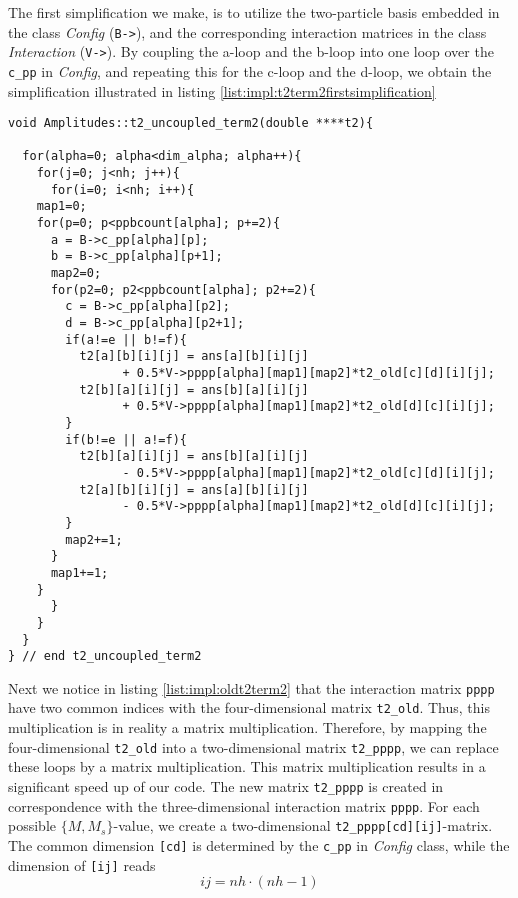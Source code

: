 The first simplification we make, is to utilize the two-particle basis embedded in the class \emph{Config} (\texttt{B->}), and the corresponding interaction matrices in the class \emph{Interaction} (\texttt{V->}). By coupling the a-loop and the b-loop into one loop over the \texttt{c\_pp} in \emph{Config}, and repeating this for the c-loop and the d-loop, we obtain the simplification illustrated in listing \ref{list:impl:t2term2firstsimplification}
\begin{lstlisting}[label={list:impl:t2term2firstsimplification},caption={illustrates the first simplification of M.P.Lohne's implementation of amp1 class function t2\_uncoupled\_term2}]
void Amplitudes::t2_uncoupled_term2(double ****t2){

  for(alpha=0; alpha<dim_alpha; alpha++){
    for(j=0; j<nh; j++){
      for(i=0; i<nh; i++){
	map1=0;
	for(p=0; p<ppbcount[alpha]; p+=2){
	  a = B->c_pp[alpha][p];
	  b = B->c_pp[alpha][p+1];
	  map2=0;
	  for(p2=0; p2<ppbcount[alpha]; p2+=2){
	    c = B->c_pp[alpha][p2];
	    d = B->c_pp[alpha][p2+1];
	    if(a!=e || b!=f){
	      t2[a][b][i][j] = ans[a][b][i][j] 
                + 0.5*V->pppp[alpha][map1][map2]*t2_old[c][d][i][j];
	      t2[b][a][i][j] = ans[b][a][i][j] 
                + 0.5*V->pppp[alpha][map1][map2]*t2_old[d][c][i][j];
	    }
	    if(b!=e || a!=f){
	      t2[b][a][i][j] = ans[b][a][i][j] 
                - 0.5*V->pppp[alpha][map1][map2]*t2_old[c][d][i][j];
	      t2[a][b][i][j] = ans[a][b][i][j] 
                - 0.5*V->pppp[alpha][map1][map2]*t2_old[d][c][i][j];
	    }
	    map2+=1;
	  }
	  map1+=1;
	}
      }
    }
  }
} // end t2_uncoupled_term2  
\end{lstlisting}
Next we notice in listing \ref{list:impl:oldt2term2} that the interaction matrix \texttt{pppp} have two common indices with the four-dimensional matrix \texttt{t2\_old}. Thus, this multiplication is in reality a matrix multiplication. Therefore, by mapping the four-dimensional \texttt{t2\_old} into a two-dimensional matrix \texttt{t2\_pppp}, we can replace these loops by a matrix multiplication. This matrix multiplication results in a significant speed up of our code. The new matrix \texttt{t2\_pppp} is created in correspondence with the three-dimensional interaction matrix \texttt{pppp}. For each possible $\{M,M_s\}$-value, we create a two-dimensional \texttt{t2\_pppp[cd][ij]}-matrix. The common dimension \texttt{[cd]} is determined by the \texttt{c\_pp} in \emph{Config} class, while the dimension of \texttt{[ij]} reads
\begin{equation*}
ij = nh \cdot (nh-1)
\label{eq:impl:ijdimension}
\end{equation*}
